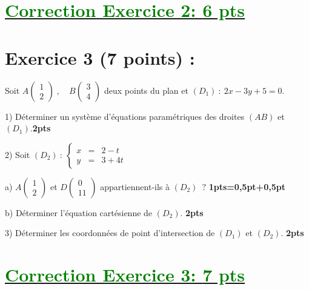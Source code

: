 \documentclass[12pt]{article}
\begin{document}
\section*{\underline{\textcolor{green}{Correction Exercice 2: \textbf{6 pts}}}}
\section*{Exercice 3 (7 points) :}
Soit $A\begin{pmatrix} 1 \\ 2\end{pmatrix}\;,\quad B\begin{pmatrix} 3 \\ 4\end{pmatrix}$ deux points du plan et $(D_{1})\ :\ 2x-3y+5=0.$

1) Déterminer un système d'équations paramétriques des droites $(AB)$ et $(D_{1}).$\textbf{2pts}

2) Soit $(D_{2})\ :\ \left\lbrace\begin{array}{rcl} x&=&2-t \\ y&=&3+4t\end{array}\right.$

a) $A\begin{pmatrix} 1 \\ 2\end{pmatrix}$ et $D\begin{pmatrix} 0 \\ 11\end{pmatrix}$ appartiennent-ils à $(D_{2})\;\ ?$ \textbf{1pts=0,5pt+0,5pt}

b) Déterminer l'équation cartésienne de $(D_{2})$. \textbf{2pts}

3) Déterminer les coordonnées de point d'intersection de $(D_{1})$ et $(D_{2})$. \textbf{2pts}
\section*{\underline{\textcolor{green}{Correction Exercice 3: \textbf{7 pts}}}}
\end{document}

